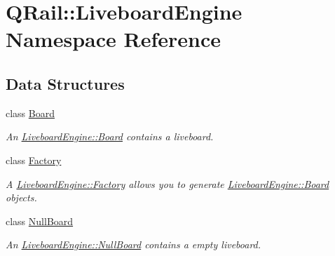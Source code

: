 \hypertarget{namespaceQRail_1_1LiveboardEngine}{}\section{Q\+Rail\+::Liveboard\+Engine Namespace Reference}
\label{namespaceQRail_1_1LiveboardEngine}
\subsection*{Data Structures}
\begin{DoxyCompactItemize}
\item 
class \mbox{\hyperlink{classQRail_1_1LiveboardEngine_1_1Board}{Board}}
\begin{DoxyCompactList}\small\item\em An \mbox{\hyperlink{classQRail_1_1LiveboardEngine_1_1Board}{Liveboard\+Engine\+::\+Board}} contains a liveboard. \end{DoxyCompactList}\item 
class \mbox{\hyperlink{classQRail_1_1LiveboardEngine_1_1Factory}{Factory}}
\begin{DoxyCompactList}\small\item\em A \mbox{\hyperlink{classQRail_1_1LiveboardEngine_1_1Factory}{Liveboard\+Engine\+::\+Factory}} allows you to generate \mbox{\hyperlink{classQRail_1_1LiveboardEngine_1_1Board}{Liveboard\+Engine\+::\+Board}} objects. \end{DoxyCompactList}\item 
class \mbox{\hyperlink{classQRail_1_1LiveboardEngine_1_1NullBoard}{Null\+Board}}
\begin{DoxyCompactList}\small\item\em An \mbox{\hyperlink{classQRail_1_1LiveboardEngine_1_1NullBoard}{Liveboard\+Engine\+::\+Null\+Board}} contains a empty liveboard. \end{DoxyCompactList}\end{DoxyCompactItemize}
